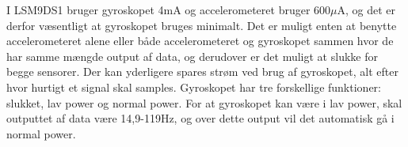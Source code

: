 I LSM9DS1 bruger gyroskopet 4mA og accelerometeret bruger 600$\mu$A, og det er derfor væsentligt at gyroskopet bruges minimalt. Det er muligt enten at benytte accelerometeret alene eller både accelerometeret og gyroskopet sammen hvor de har samme mængde output af data, og derudover er det muligt at slukke for begge sensorer. Der kan yderligere spares strøm ved brug af gyroskopet, alt efter hvor hurtigt et signal skal samples. Gyroskopet har tre forskellige funktioner: slukket, lav power og normal power. For at gyroskopet kan være i lav power, skal outputtet af data være 14,9-119Hz, og over dette output vil det automatisk gå i normal power. 
